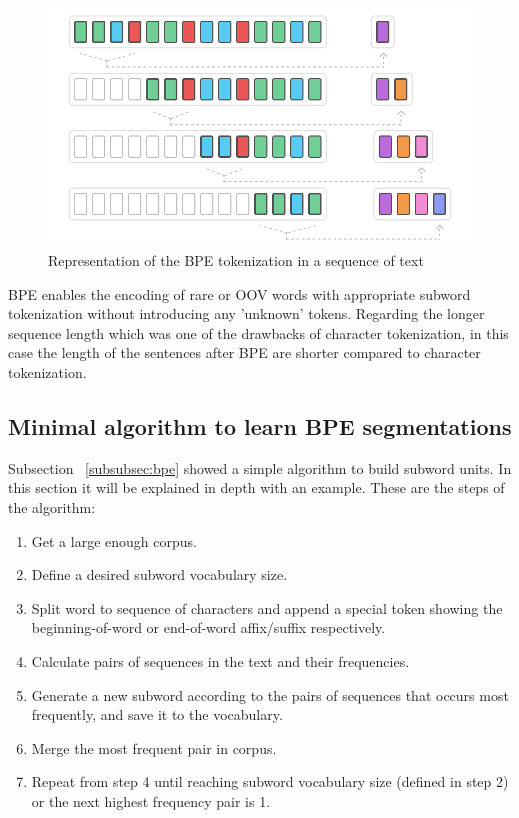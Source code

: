 \begin{figure}[!ht]
    \centering
    \includegraphics[width=14cm]{figures/bpe.png}
    \caption{Representation of the BPE tokenization in a sequence of text}
\end{figure}

BPE enables the encoding of rare or OOV words with appropriate subword tokenization without introducing any 'unknown' tokens. Regarding the longer sequence length which was one of the drawbacks of character tokenization, in this case the length of the sentences after BPE are shorter compared to character tokenization.

\subsection{Minimal algorithm to learn BPE segmentations}

Subsection ~\ref{subsubsec:bpe} showed a simple algorithm to build subword units. In this section it will be explained in depth with an example. These are the steps of the algorithm:

\begin{enumerate}
    \item Get a large enough corpus.
    \item Define a desired subword vocabulary size.
    \item Split word to sequence of characters and append a special token showing the beginning-of-word or end-of-word affix/suffix respectively.
    \item Calculate pairs of sequences in the text and their frequencies.
    \item Generate a new subword according to the pairs of sequences that occurs most frequently, and save it to the vocabulary.
    \item Merge the most frequent pair in corpus.
    \item Repeat from step 4 until reaching subword vocabulary size (defined in step 2) or the next highest frequency pair is 1.
\end{enumerate}


